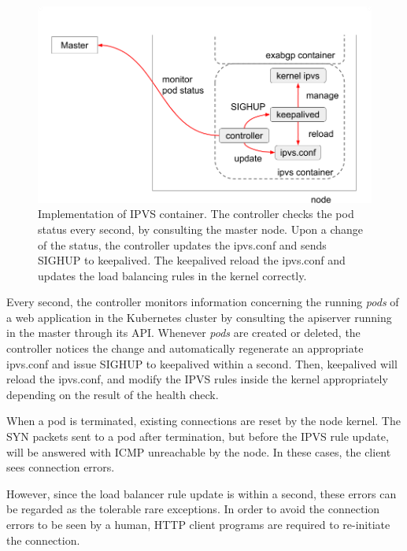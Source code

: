 \begin{figure}[h]
  \centering
  \includegraphics[width=0.8\columnwidth]{Figs/ipvs-ingress-schem}
  
    \par\bigskip
    \centering
    \begin{minipage}{0.9\columnwidth}
      \caption[Implementation of IPVS container]{
        Implementation of IPVS container.
        The controller checks the pod status every second, by consulting the master node.
        Upon a change of the status, the controller updates the ipvs.conf and sends SIGHUP to keepalived.
        The keepalived reload the ipvs.conf and updates the load balancing rules in the kernel correctly.
      }
      \label{fig:ipvs-ingress-schem}
    \end{minipage}
\end{figure}

Every second, the controller monitors information concerning the running {\em pods} of a web application in the Kubernetes cluster by consulting the apiserver running in the master through its API.
Whenever {\em pods} are created or deleted, the controller notices the change and automatically regenerate an appropriate ipvs.conf 
and issue SIGHUP to keepalived within a second.
Then, keepalived will reload the ipvs.conf, and modify the IPVS rules inside the kernel appropriately depending on the result of the health check.

When a pod is terminated, existing connections are reset by the node kernel.
The SYN packets sent to a pod after termination, but before the IPVS rule update, will be answered with ICMP unreachable by the node.
In these cases, the client sees connection errors.

However, since the load balancer rule update is within a second, these errors can be regarded as the tolerable rare exceptions.
In order to avoid the connection errors to be seen by a human, HTTP client programs are required to re-initiate the connection.

